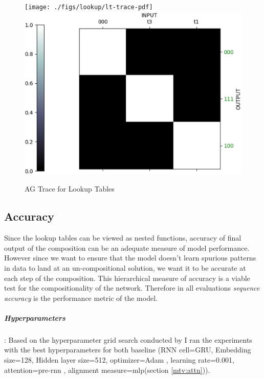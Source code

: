 \begin{figure}
	\begin{minipage}[t]{\textwidth}
		\ifpdf
		\texttt{[image: ./figs/lookup/lt-trace-pdf]}
		\else
		\includegraphics[width=\linewidth,keepaspectratio=true]{./figs/lookup/lt-trace-eps}
		\fi
		\caption{AG Trace for Lookup Tables}
		\label{ag_lt}
	\end{minipage}
\end{figure}


\subsection{Accuracy}
Since the lookup tables can be viewed as nested functions, accuracy of final output of the composition can be an adequate measure of model performance. However since we want to ensure that the model doesn't learn spurious patterns in data to land at an un-compositional solution, we want it to be accurate at each step of the composition. This hierarchical measure of accuracy is a viable test for the compositionality of the network. Therefore in all evaluations \textit{sequence accuracy} is the performance metric of the model.

\subparagraph{Hyperparameters}: Based on the hyperparameter grid search conducted by \cite{Hupkes2018} I ran the experiments with the best hyperparameters for both baseline (RNN cell=GRU, Embedding size=128, Hidden layer size=512, optimizer=Adam \citep{KingmaB14}, learning rate=0.001, attention=pre-rnn \citep{Bahdanau2014}, alignment measure=mlp(section \ref{mtv:attn})).

